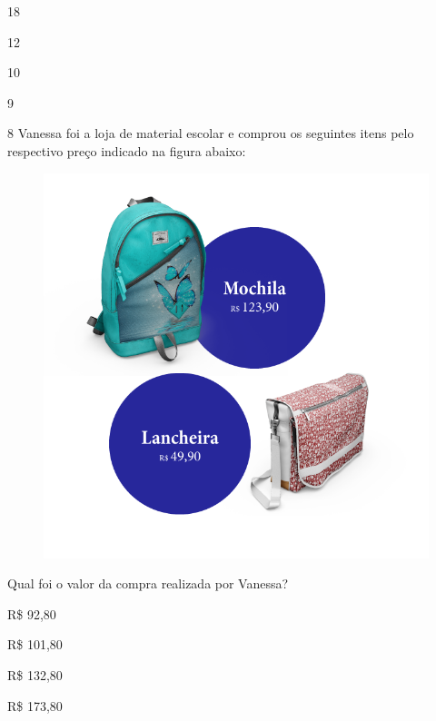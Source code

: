 \begin{escolha}
\item
  18
\item
  12
\item
  10
\item
  9
\end{escolha}


\num{8} Vanessa foi a loja de material escolar e comprou os seguintes itens
pelo respectivo preço indicado na figura abaixo:

\begin{figure}[htpb!]
\includegraphics[width=\textwidth]{../ilustracoes/MAT5/SAEB_5ANO_MAT_figura119.png}
\end{figure}

Qual foi o valor da compra realizada por Vanessa?

\begin{escolha}
\item
  R\$ 92,80
\item
  R\$ 101,80
\item
  R\$ 132,80
\item
  R\$ 173,80
\end{escolha}


